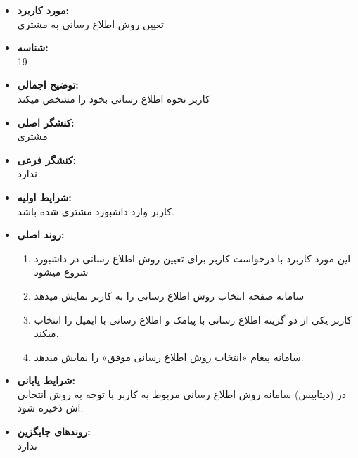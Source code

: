 \documentclass{article}
\begin{document}
\begin{itemize}
\item \textbf{مورد کاربرد:}\\
تعیین روش اطلاع رسانی به مشتری
\item \textbf{شناسه:}\\
19
\item \textbf{توضیح اجمالی:}\\
کاربر نحوه اطلاع رسانی بخود را مشخص میکند
\item \textbf{کنشگر اصلی:}\\
مشتری
\item \textbf{کنشگر فرعی:}\\
ندارد
\item \textbf{شرایط اولیه:}\\
کاربر وارد داشبورد مشتری شده باشد.
\item \textbf{روند اصلی:}\\
\begin{enumerate}
\item  این مورد کاربرد با درخواست کاربر برای تعیین روش اطلاع رسانی در داشبورد شروع میشود
\item سامانه صفحه انتخاب روش اطلاع رسانی را به کاربر نمایش میدهد
\item کاربر یکی از دو گزینه اطلاع رسانی با پیامک و اطلاع رسانی با ایمیل را انتخاب میکند.
\item  سامانه پیغام «انتخاب روش اطلاع رسانی موفق» را نمایش میدهد.
\end{enumerate}
\item \textbf{شرایط پایانی:}\\ 
در (دیتابیس) سامانه روش اطلاع رسانی مربوط به کاربر با توجه به روش انتخابی اش ذخیره شود.
\item \textbf{روندهای جایگزین:}\\
ندارد
\end{itemize}
\noindent\makebox[\linewidth]{\rule{\paperwidth}{0.4pt}}
\end{document}
